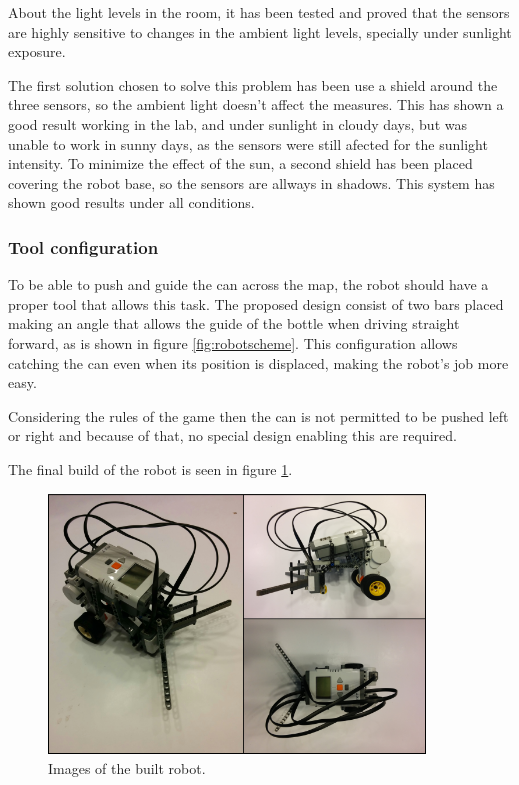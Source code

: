 About the light levels in the room, it has been tested and proved that the sensors are highly sensitive to changes in 
the ambient light levels, specially under sunlight exposure. 

The first solution chosen to solve this problem has been use a shield around the three sensors, so the ambient light 
doesn't affect the measures.
This has shown a good result working in the lab, and under sunlight in cloudy days, but was unable to work in sunny days,
as the sensors were still afected for the sunlight intensity.
To minimize the effect of the sun, a second shield has been placed covering the robot base, so the sensors are allways in
shadows.
This system has shown good results under all conditions.



\subsubsection{Tool configuration}

To be able to push and guide the can across the map, the robot should have a proper tool that allows this task. 
The proposed design consist of two bars placed making an angle that allows the guide of the bottle when driving straight forward, as is shown in figure \ref{fig:robotscheme}.
This configuration allows catching the can even when its position is displaced, making the robot's job more easy.

Considering the rules of the game then the can is not permitted to be pushed left or right and because of that, no special design enabling this are required.


The final build of the robot is seen in figure \ref{fig:robotImage}.

\begin{figure}[H]
\includegraphics[width=10cm]{Fig1.png}
\centering
\caption{Images of the built robot.}
\label{fig:robotImage}
\end{figure}

